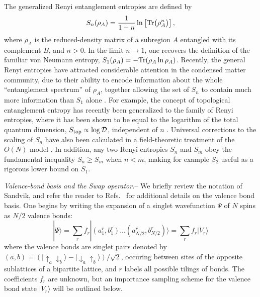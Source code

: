 \documentclass[prl,aps,twocolumn,floatfix,amsmath,amssymb,superscriptaddress,tightenlines]{revtex4}
\begin{document}
The generalized Renyi entanglement entropies are defined by
\begin{equation}
S_{n} (\rho_A) = \frac{1}{1- n} \ln \left[{ {\rm Tr}\big( \rho_A^{n} \big) }\right],
\label{Sn}
\end{equation}
where $\rho_A$ is the reduced-density matrix of a subregion $A$ entangled with its complement $B$, and 
$n>0$.  In the limit $n \rightarrow 1$, one recovers the 
definition of the familiar von Neumann entropy, $S_1 (\rho_A) = - {\rm Tr}( \rho_A \ln \rho_A )$.  
Recently, the general Renyi entropies have attracted considerable attention in the condensed matter community, due to their ability to encode
information about the whole ``entanglement spectrum'' of $\rho_A$, together allowing the set of $S_{n}$ to contain 
much more information than $S_1$ alone \cite{Espec}.  For example, the concept of topological entanglement entropy has recently been
generalized to the family of Renyi entropies, where it has been shown to be equal to the logarithm of the total quantum 
dimension, $S_{\rm top} \propto \log {\mathcal D}$, independent of $n$ \cite{PI}.  Universal corrections to the scaling of $S_{n}$ 
have also been calculated in a field-theoretic treatment of the $O(N)$ model \cite{Max}.
In addition, any two Renyi entropies $S_{n}$ and $S_{m}$ obey the fundamental
inequality $S_{n} \geq S_{m}$ when $n < m$, making for example $S_2$ useful as a rigorous
lower bound on $S_1$.  


{\it Valence-bond basis and the Swap operator.}-- We briefly review the notation of Sandvik, and refer the reader to 
Refs.~\cite{Sandvik,Beach,AWSloop} for additional details on the valence bond basis.
One begins by writing the expansion of a singlet
wavefunction $\Psi$ of $N$ spins as $N/2$ valence bonds:
\begin{equation}
| \Psi \rangle = \sum_r f_r|(a^r_1,b^r_1) \ldots (a^r_{N/2},b^r_{N/2}) \rangle = \sum_r f_r| V_r \rangle
\end{equation}
where the valence bonds are singlet pairs denoted by $(a,b) = (\lvert\uparrow_a \downarrow_b \rangle - \lvert\downarrow_a \uparrow_b\rangle)/\sqrt{2}$,
occuring between sites of the opposite sublattices of a bipartite lattice, and $r$ labels all possible tilings of bonds.  The coefficients $f_r$ are unknown, but an importance sampling scheme \cite{Sandvik} for the valence bond state $| V_r \rangle$ will be outlined below.  
\end{document}
